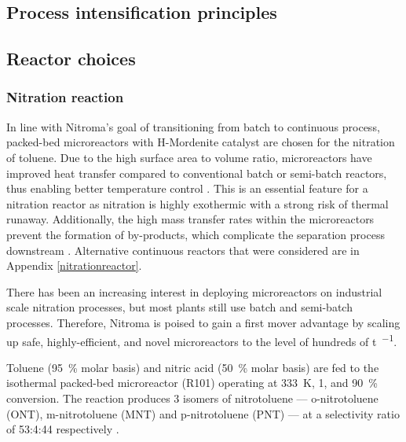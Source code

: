 \subsection{Process intensification principles}


\subsection{Reactor choices}


\subsubsection{Nitration reaction}

In line with Nitroma's goal of transitioning from batch to continuous process, packed-bed microreactors with H-Mordenite catalyst are chosen for the nitration of toluene. Due to the high surface area to volume ratio, microreactors have improved heat transfer compared to conventional batch or semi-batch reactors, thus enabling better temperature control \cite{halder_nitration_2007}. This is an essential feature for a nitration reactor as nitration is highly exothermic with a strong risk of thermal runaway. Additionally, the high mass transfer rates within the microreactors prevent the formation of by-products, which complicate the separation process downstream \cite{halder_nitration_2007}.
Alternative continuous reactors that were considered are in Appendix \ref{nitrationreactor}. 

There has been an increasing interest in deploying microreactors on industrial scale nitration processes, but most plants still use batch and semi-batch processes. Therefore, Nitroma is poised to gain a first mover advantage by scaling up safe, highly-efficient, and novel microreactors to the level of hundreds of \si{\tonne\per\year}.

Toluene (\SI{95}{\percent} molar basis) and nitric acid (\SI{50}{\percent} molar basis) are fed to the isothermal packed-bed microreactor (R101) operating at \SI{333}{\K}, \SI{1}{\atm}, and \SI{90}{\percent} conversion. The reaction produces 3 isomers of nitrotoluene --- o-nitrotoluene (ONT), m-nitrotoluene (MNT) and p-nitrotoluene (PNT) --- at a selectivity ratio of 53:4:44 respectively \cite{smith_novel_1998}.


